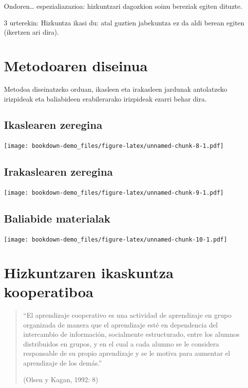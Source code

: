 \documentclass[
]{book}
\begin{document}
Ondoren\ldots{} espezialiazazioa: hizkuntzari dagozkion soinu bereziak egiten dituzte.

3 urterekin: Hizkuntza ikasi du: atal guztien jabekuntza ez da aldi berean egiten (ikertzen ari dira).

\hypertarget{metodoaren-diseinua}{%
\section{Metodoaren diseinua}\label{metodoaren-diseinua}}

Metodoa diseinatzeko orduan, ikasleen eta irakasleen jardunak antolatzeko irizpideak eta baliabideen erabilerarako irizpideak ezarri behar dira.

\hypertarget{ikaslearen-zeregina}{%
\subsection{Ikaslearen zeregina}\label{ikaslearen-zeregina}}

\texttt{[image: bookdown-demo\_files/figure-latex/unnamed-chunk-8-1.pdf]}

\hypertarget{irakaslearen-zeregina}{%
\subsection{Irakaslearen zeregina}\label{irakaslearen-zeregina}}

\texttt{[image: bookdown-demo\_files/figure-latex/unnamed-chunk-9-1.pdf]}

\hypertarget{baliabide-materialak}{%
\subsection{Baliabide materialak}\label{baliabide-materialak}}

\texttt{[image: bookdown-demo\_files/figure-latex/unnamed-chunk-10-1.pdf]}

\hypertarget{hizkuntzaren-ikaskuntza-kooperatiboa}{%
\section{Hizkuntzaren ikaskuntza kooperatiboa}\label{hizkuntzaren-ikaskuntza-kooperatiboa}}

\begin{quote}
``El aprendizaje cooperativo es una actividad de aprendizaje en grupo organizada de manera que el aprendizaje esté en dependencia del intercambio de información, socialmente estructurado, entre los alumnos distribuidos en grupos, y en el cual a cada alumno se le considera responsable de su propio aprendizaje y se le motiva para aumentar el aprendizaje de los demás.''

(Olsen y Kagan, 1992: 8)
\end{quote}
\end{document}
